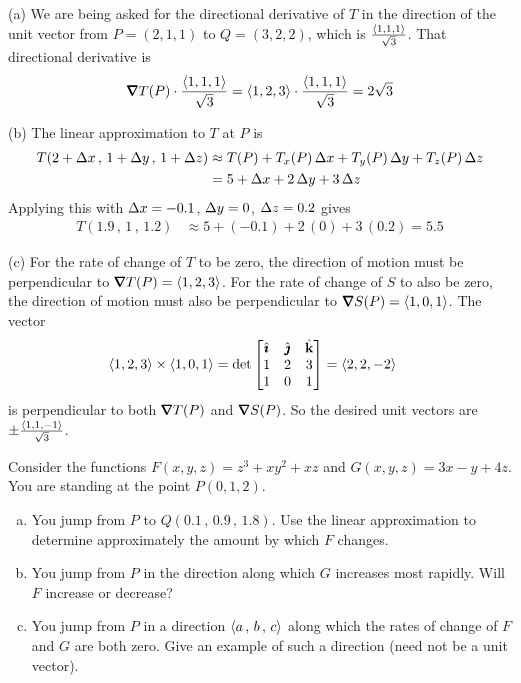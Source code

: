 \begin{solution}
(a) We are being asked for the directional derivative of
$T$ in the direction of the  unit vector from $P=(2,1,1)$ to $Q=(3,2,2)$, 
which is $\frac{\left< 1,1,1\right>}{\sqrt{3}}$. That directional
derivative is
\begin{align*}
\vnabla T(P)\cdot \frac{\llt 1,1,1\rgt}{\sqrt{3}}
=\llt 1,2,3\rgt \cdot \frac{\llt 1,1,1\rgt}{\sqrt{3}}
=2\sqrt{3}
\end{align*}

(b) The linear approximation to $T$ at $P$ is
\begin{align*}
T(2+\Delta x\,,\,1+\Delta y\,,\,1+\Delta z)
   &\approx T(P) + T_x(P)\,\Delta x + T_y(P)\,\Delta y + T_z(P)\,\Delta z \\
   &= 5 +\Delta x +2\,\Delta y +3\,\Delta z 
\end{align*}
Applying this with $\Delta x = -0.1$, $\Delta y = 0$, $\Delta z=0.2$ gives
\begin{align*}
T(1.9\,,\,1\,,\,1.2)
   &\approx 5 +(-0.1) +2\,(0) +3\,(0.2) 
   =5.5
\end{align*}

(c) For the rate of change of $T$ to be zero, the direction of
motion must be perpendicular to $\vnabla T(P) = \llt 1,2,3\rgt$.
For the rate of change of $S$ to also be zero, the direction of
motion must also be perpendicular to $\vnabla S(P) = \llt 1,0,1\rgt$.
The vector 
\begin{align*}
\left< 1,2,3\right> \times \left< 1,0,1\right>
&=\det\left[\begin{matrix}
             \hat{\pmb{\imath}} & \hat{\pmb{\jmath}} & \hat{\mathbf{k}}\\ 
              1  &  2  & 3 \\
              1  &  0  & 1\end{matrix}\right]
=\left< 2,2,-2\right>
\end{align*}
is perpendicular to both $\vnabla T(P)$ and $\vnabla S(P)$.
So the desired unit vectors are $\pm\frac{\left< 1,1,-1\right>}{\sqrt{3}}$.
\end{solution}

\begin{question}[M200 2016D] %
Consider the functions $F(x,y,z) = z^3 +xy^2 +xz$ and $G(x,y,z)=3x-y+4z$.
You are standing at the point $P(0,1,2)$.
\begin{enumerate}[(a)]
\item
You jump from $P$ to $Q(0.1\,,\,0.9\,,\,1.8)$. Use the linear approximation
to determine approximately the amount by which $F$ changes.

\item
You jump from $P$ in the direction along which $G$ increases most rapidly.
Will $F$ increase or decrease?

\item
You jump from $P$ in a direction $\left< a\,,\,b\,,\,c\right>$ along which the rates 
of change of $F$ and $G$ are both zero. Give an example of such a direction
(need not be a unit vector).

\end{enumerate}
\end{question}

